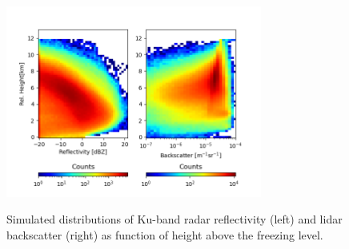 \documentclass{ametsocV6.1}
\begin{document}
\begin{figure}[t]
    \centering
    \includegraphics[width=0.75\textwidth,angle=0]{./Figs/fig03.png}\\
    \caption{Simulated distributions of Ku-band radar reflectivity (left) and lidar backscatter (right)
    as function of height above 
    the freezing level.}\label{f3}
\end{figure}
\end{document}
